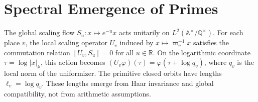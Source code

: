 \section{Spectral Emergence of Primes}
The global scaling flow $S_u : x \mapsto e^{-u}x$ acts unitarily on $L^2(\mathbb{A}^\times/\mathbb{Q}^\times)$. For each place $v$, the local scaling operator $U_v$ induced by $x \mapsto \varpi_v^{-1}x$ satisfies the commutation relation $[U_v, S_u] = 0$ for all $u \in \mathbb{R}$. On the logarithmic coordinate $\tau = \log|x|_\mathbb{A}$, this action becomes $(U_v\varphi)(\tau) = \varphi(\tau + \log q_v)$, where $q_v$ is the local norm of the uniformizer. The primitive closed orbits have lengths $\ell_v = \log q_v$. These lengths emerge from Haar invariance and global compatibility, not from arithmetic assumptions.